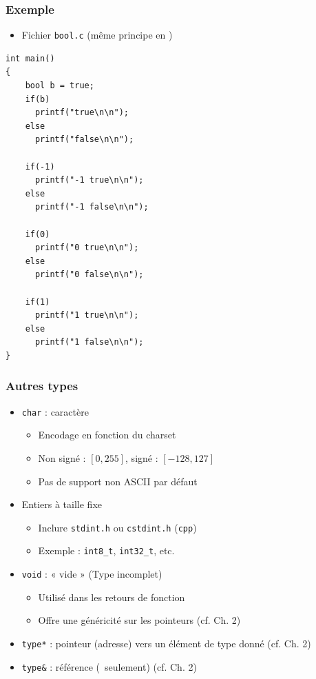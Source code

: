 \begin{frame}[containsverbatim]
\frametitle{Exemple}
\begin{itemize}
\item Fichier \texttt{bool.c} (même principe en \cpp)
\end{itemize}
\begin{lstlisting}
int main()
{
	bool b = true;
    if(b)
      printf("true\n\n");  
    else
      printf("false\n\n");

    if(-1)
      printf("-1 true\n\n");
    else
      printf("-1 false\n\n");
    
    if(0)
      printf("0 true\n\n");
    else
      printf("0 false\n\n");
    
    if(1)
      printf("1 true\n\n");
    else
      printf("1 false\n\n");
}
\end{lstlisting}
\end{frame}

\begin{frame}
\frametitle{Autres types}
\begin{itemize}[<+->]
\item \lstinline|char| : caractère
	\begin{itemize}
	\item Encodage en fonction du charset
	\item Non signé : $[0,255]$, signé : $[-128,127]$
	\item Pas de support non ASCII par défaut
	\end{itemize}
\item Entiers à taille fixe
	\begin{itemize}
	\item Inclure \texttt{stdint.h} ou \texttt{cstdint.h} (\texttt{cpp})
	\item Exemple : \texttt{int8\_t}, \texttt{int32\_t}, etc.
	\end{itemize}
\item \lstinline|void| : « vide » (Type incomplet)
	\begin{itemize}
	\item Utilisé dans les retours de fonction
	\item Offre une généricité sur les pointeurs (cf. Ch. 2)
	\end{itemize}
\item \texttt{type*} : pointeur (adresse) vers un élément de type donné (cf. Ch. 2)
\item \texttt{type\&} : référence (\cpp\ seulement) (cf. Ch. 2)
\end{itemize}
\end{frame}

